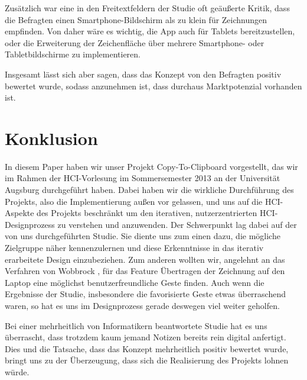 \documentclass{chi-ext}
\begin{document}
Zusätzlich war eine in den Freitextfeldern der Studie oft geäußerte Kritik, dass die Befragten einen Smartphone-Bildschirm als zu klein für Zeichnungen empfinden. Von daher wäre es wichtig, die App auch für Tablets bereitzustellen, oder die Erweiterung der Zeichenfläche über mehrere Smartphone- oder Tabletbildschirme zu implementieren.

Insgesamt lässt sich aber sagen, dass das Konzept von den Befragten positiv bewertet wurde, sodass anzunehmen ist, dass durchaus Marktpotenzial vorhanden ist.


\section{Konklusion}
In diesem Paper haben wir unser Projekt Copy-To-Clipboard vorgestellt, das wir im Rahmen der HCI-Vorlesung im Sommersemester 2013 an der Universität Augsburg durchgeführt haben. Dabei haben wir die wirkliche Durchführung des Projekts, also die Implementierung außen vor gelassen, und uns auf die HCI-Aspekte des Projekts beschränkt um den iterativen, nutzerzentrierten HCI-Designprozess zu verstehen und anzuwenden.
Der Schwerpunkt lag dabei auf der von uns durchgeführten Studie. Sie diente uns zum einen dazu, die mögliche Zielgruppe näher kennenzulernen und diese Erkenntnisse in das iterativ erarbeitete Design einzubeziehen. Zum anderen wollten wir, angelehnt an das Verfahren von Wobbrock \cite{Wobbrock}, für das Feature Übertragen der Zeichnung auf den Laptop eine möglichst benutzerfreundliche Geste finden. Auch wenn die Ergebnisse der Studie, insbesondere die favorisierte Geste etwas überraschend waren, so hat es uns im Designprozess gerade deswegen viel weiter geholfen.

Bei einer mehrheitlich von Informatikern beantwortete Studie hat es uns überrascht, dass trotzdem kaum jemand Notizen bereits rein digital anfertigt.
Dies und die Tatsache, dass das Konzept mehrheitlich positiv bewertet wurde, bringt uns zu der Überzeugung, dass sich die Realisierung des Projekts lohnen würde.\\[10em]


\balance


\end{document}
